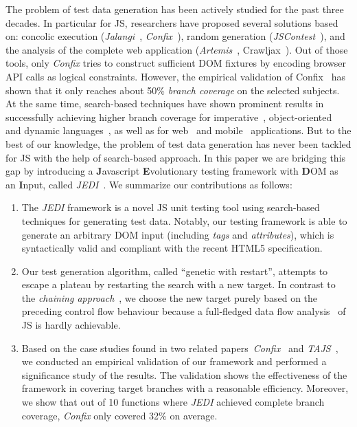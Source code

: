 The problem of test data generation has been actively studied for the past three decades. In particular for JS, researchers have proposed several solutions based on: concolic execution (\emph{Jalangi}~\cite{sen2013jalangi}, \emph{Confix}~\cite{amin:ase15}), random generation (\mbox{\emph{JSContest}}~\cite{heidegger2010contract}), and the analysis of the complete web application (\emph{Artemis}~\cite{artemis2011}, Crawljax~\cite{mesbah2012crawling}). Out of those tools, only \emph{Confix} tries to construct sufficient DOM fixtures by encoding browser API calls as logical constraints. However, the empirical validation of Confix~\cite{amin:ase15} has shown that it only reaches about 50\% \emph{branch coverage} on the selected subjects. At the same time, search-based techniques have shown prominent results in successfully achieving higher branch coverage for imperative~\cite{wegener2001evolutionary}, object-oriented~\cite{fraser2011evosuite} and dynamic languages~\cite{irawan2016test, wibowo2015unit}, as well as for web~\cite{alshahwan2011automated} and mobile~\cite{mao2016sapienz} applications. But to the best of our knowledge, the problem of test data generation has never been tackled for JS with the help of search-based approach. In this paper we are bridging this gap by introducing a \textbf{J}avascript \textbf{E}volutionary testing framework with \textbf{D}OM as an \textbf{I}nput, called \emph{JEDI}~\cite{jedi}. We summarize our contributions as follows:
\begin{enumerate}[leftmargin=5mm]
\item The \emph{JEDI} framework is a novel JS unit testing tool using search-based techniques for generating test data. Notably, our testing framework is able to generate an arbitrary DOM input (including \emph{tags} and \emph{attributes}), which is syntactically valid and compliant with the recent HTML5 specification.
\item Our test generation algorithm, called ``genetic with restart'', attempts to escape a plateau by restarting the search with a new target. In contrast to the \emph{chaining approach}~\cite{ferguson1996chaining}, we choose the new target purely based on the preceding control flow behaviour because a full-fledged data flow analysis~\cite{jang2009points} of JS is hardly achievable.
\item Based on the case studies found in two related papers~\emph{Confix}~\cite{amin:ase15} and \emph{TAJS}~\cite{dom2011}, we conducted an empirical validation of our framework and performed a significance study of the results. The validation shows the effectiveness of the framework in covering target branches with a reasonable efficiency. Moreover, we show that out of 10 functions where \emph{JEDI} achieved complete branch coverage, \emph{Confix} only covered 32\% on average.
\end{enumerate}

